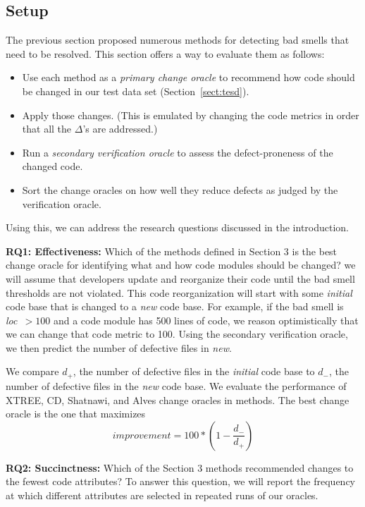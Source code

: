 \documentclass[twocolumn,5p]{elsarticle}
\newcommand{\bi}{\begin{itemize}[leftmargin=0.4cm]}
\newcommand{\ei}{\end{itemize}}
\theoremstyle{break}
\begin{document}
\begin{itemize}
		      
		\section{Setup}
		The previous section proposed numerous methods for detecting bad smells that need
		to be resolved. This section offers a way to evaluate them as follows:
		\bi
		\item Use each method as a {\em primary change oracle} to recommend how code should be changed in our test data set (Section~\ref{sect:tesd}).
		\item Apply those changes. (This is emulated by changing the code metrics in order that all the $\Delta$'s are addressed.)
		\item Run a {\em secondary verification oracle} to assess the defect-proneness of the changed code.
		\item Sort the change oracles on how well they reduce defects as judged by the verification oracle.
		\ei
		Using this, we can address the research questions discussed in the introduction.
		
		{\bf RQ1: Effectiveness: } Which of the methods defined in Section 3 is the best change oracle for identifying what and how code modules should be changed? 
		we will assume that developers
		update and reorganize their code until the bad smell thresholds are not violated.
		This code reorganization will start with some {\em initial} code
		base that is changed to a {\em new} code base. For example, if the bad smell is \mbox{{\em loc $>100$}} and a 
		code module has 500 lines of code, we reason
		optimistically that we can change that code metric
		to 100.  Using the secondary verification oracle,  we then predict the
		number of defective files in {\em new}. 
		
		We compare $d_+$, the number of defective files in the \textit{initial} code base to $d_-$, the number of defective files in the \textit{new} code base.
		We evaluate the performance of XTREE, CD, Shatnawi, and Alves change oracles in methods. The best change oracle is the one that maximizes
		\begin{equation}\label{eq:diff}
			\mathit{improvement} = 100* \left(1 - \frac{ d_- }{ d_+}\right)
		\end{equation}
		
		
		{\bf RQ2: Succinctness: } Which of the Section 3 methods recommended changes to the fewest code attributes?
		To answer this question, we will report the frequency at which different attributes are selected in repeated runs of our oracles.
		

\end{itemize}
\end{document}
